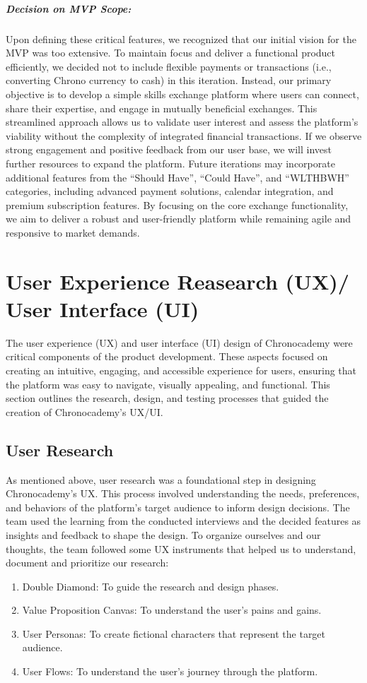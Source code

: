 \subparagraph{Decision on MVP Scope:}
Upon defining these critical features, we recognized that our initial vision for the MVP was too extensive.
To maintain focus and deliver a functional product efficiently, we decided not to include flexible payments or transactions (i.e., converting Chrono currency to cash) in this iteration.
Instead, our primary objective is to develop a simple skills exchange platform where users can connect, share their expertise, and engage in mutually beneficial exchanges.
This streamlined approach allows us to validate user interest and assess the platform's viability without the complexity of integrated financial transactions.
If we observe strong engagement and positive feedback from our user base, we will invest further resources to expand the platform.
Future iterations may incorporate additional features from the ``Should Have'', ``Could Have'', and ``WLTHBWH'' categories, including advanced payment solutions, calendar integration, and premium subscription features.
By focusing on the core exchange functionality, we aim to deliver a robust and user-friendly platform while remaining agile and responsive to market demands.
\clearpage

\section{User Experience Reasearch (UX)/ User Interface (UI)}\label{sec:user-experience-reasearch-(ux)/-user-interface-(ui)}
The user experience (UX) and user interface (UI) design of Chronocademy were critical components of the product development.
These aspects focused on creating an intuitive, engaging, and accessible experience for users, ensuring that the platform was easy to navigate, visually appealing, and functional.
This section outlines the research, design, and testing processes that guided the creation of Chronocademy's UX/UI\@.

\subsection{User Research}\label{subsec:user-research}
As mentioned above, user research was a foundational step in designing Chronocademy's UX\@.
This process involved understanding the needs, preferences, and behaviors of the platform's target audience to inform design decisions.
The team used the learning from the conducted interviews and the decided features as insights and feedback to shape the design.
To organize ourselves and our thoughts, the team followed some UX instruments that helped us to understand, document and prioritize our research:\newline
\begin{enumerate}
    \item Double Diamond: To guide the research and design phases.
    \item Value Proposition Canvas: To understand the user's pains and gains.
    \item User Personas: To create fictional characters that represent the target audience.
    \item User Flows: To understand the user's journey through the platform.
\end{enumerate}

